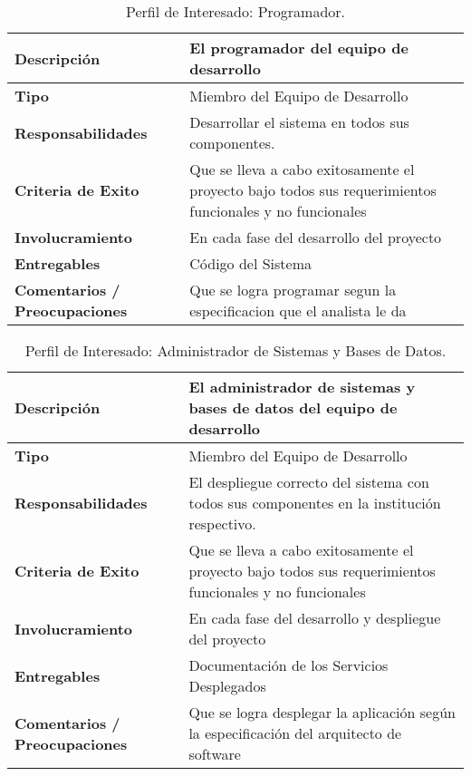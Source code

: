 \begin{table}[h!]
  \begin{tabular}{|p{}|p{}|}
    \hline
    \textbf{Descripción} & El programador del equipo de desarrollo \\
    \hline
    \textbf{Tipo} & Miembro del Equipo de Desarrollo \\
    \hline
    \textbf{Responsabilidades} & Desarrollar el sistema en todos sus componentes. \\
    \hline
    \textbf{Criteria de Exito} & Que se lleva a cabo exitosamente el proyecto bajo todos sus requerimientos funcionales y no funcionales \\
    \hline
    \textbf{Involucramiento} & En cada fase del desarrollo del proyecto \\
    \hline
    \textbf{Entregables} & Código del Sistema \\
    \hline
    \textbf{Comentarios / Preocupaciones} & Que se logra programar segun la especificacion que el analista le da \\
    \hline
  \end{tabular}
  \caption{Perfil de Interesado: Programador.}
  \label{per-inter-programer}
\end{table}

\begin{table}[h!]
  \begin{tabular}{|p{}|p{}|}
    \hline
    \textbf{Descripción} & El administrador de sistemas y bases de datos del equipo de desarrollo \\
    \hline
    \textbf{Tipo} & Miembro del Equipo de Desarrollo \\
    \hline
    \textbf{Responsabilidades} & El despliegue correcto del sistema con todos sus componentes en la institución respectivo. \\
    \hline
    \textbf{Criteria de Exito} & Que se lleva a cabo exitosamente el proyecto bajo todos sus requerimientos funcionales y no funcionales \\
    \hline
    \textbf{Involucramiento} & En cada fase del desarrollo y despliegue del proyecto \\
    \hline
    \textbf{Entregables} & Documentación de los Servicios Desplegados \\
    \hline
    \textbf{Comentarios / Preocupaciones} & Que se logra desplegar la aplicación según la especificación del arquitecto de software \\
    \hline
  \end{tabular}
  \caption{Perfil de Interesado: Administrador de Sistemas y Bases de Datos.}
  \label{per-inter-programer}
\end{table}

